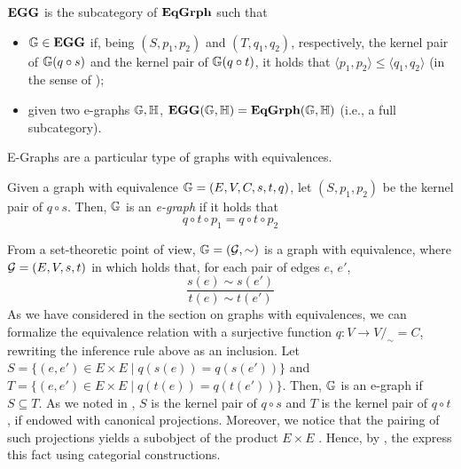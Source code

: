 \begin{definition}\label{def:cat_of_eggs}
    $\mathbf{EGG}$ is the subcategory of $\mathbf{EqGrph}$ such that
	\begin{itemize}
		\item $\mathbb{G} \in \mathbf{EGG}$ if, being $(S, p_1, p_2)$ and $(T, q_1, q_2)$, respectively, the kernel pair of $\mathbb{G}(q \circ s)$ and the kernel pair of $\mathbb{G}(q \circ t)$, it holds that $\langle p_1, p_2 \rangle \leq \langle q_1, q_2 \rangle$ (in the sense of );
		\item given two e-graphs $\mathbb{G, H}$, $\mathbf{EGG}(\mathbb{G, H}) =\mathbf{EqGrph}(\mathbb{G, H})$ (i.e., a full subcategory).
	\end{itemize}
\end{definition}

\fi

E-Graphs are a particular type of graphs with equivalences.

\begin{definition}[E-Graph]\label{def:e_graph}
	Given a graph with equivalence $\mathbb{G} = (E, V, C, s, t, q)$, let $(S, p_1, p_2)$ be the kernel pair of $q \circ s$. Then, $\mathbb{G}$ is an \emph{e-graph} if it holds that
	\[
		q \circ t \circ p_1 = q \circ t \circ p_2
	\]
\end{definition}

\begin{remark}
	From a set-theoretic point of view, $\mathbb{G} = (\mathcal{G}, \sim)$ is a graph with equivalence, where $\mathcal{G} = (E, V, s, t)$ in which holds that, for each pair of edges $e$, $e'$,
	\[
		\frac{s(e)\sim s(e')}{t(e)\sim t(e')}
	\]
	As we have considered in the section on graphs with equivalences, we can formalize the equivalence relation with a surjective function $q: V \to V/_\sim = C$, rewriting the inference rule above as an inclusion.
	Let $S = \{(e, e') \in E\times E \mid q(s(e)) = q(s(e'))\}$ and $T = \{(e, e') \in E \times E \mid q(t(e)) = q(t(e'))\}$. Then, $\mathbb{G}$ is an e-graph if $S \subseteq T$. As we noted in , $S$ is the kernel pair of $q \circ s$ and $T$ is the kernel pair of $q \circ t$, if endowed with canonical projections. Moreover, we notice that the pairing of such projections yields a subobject of the product $E \times E$ . Hence, by , the  express this fact using categorial constructions.
\end{remark}

